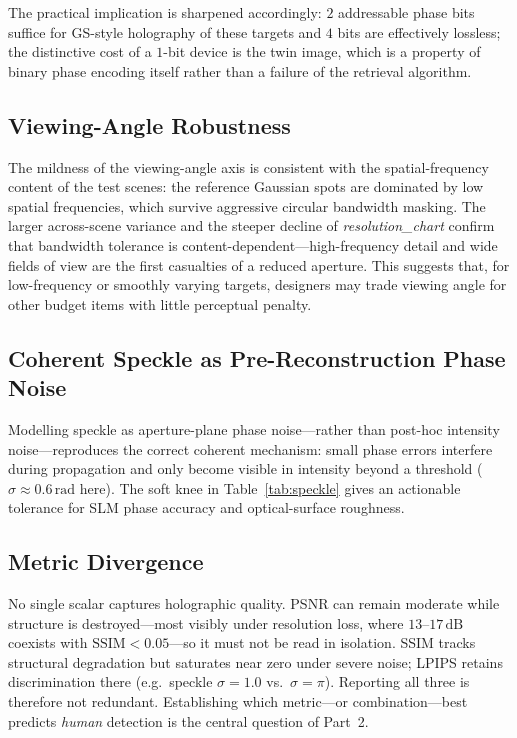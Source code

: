 \documentclass[conference]{IEEEtran}
\begin{document}
The practical implication is sharpened accordingly: $2$ addressable phase bits
suffice for GS-style holography of these targets and $4$ bits are effectively
lossless; the distinctive cost of a $1$-bit device is the twin image, which is a
property of binary phase encoding itself rather than a failure of the retrieval
algorithm.

\subsection{Viewing-Angle Robustness}
The mildness of the viewing-angle axis is consistent with the spatial-frequency
content of the test scenes: the reference Gaussian spots are dominated by
low spatial frequencies, which survive aggressive circular bandwidth masking. The
larger across-scene variance and the steeper decline of \textit{resolution\_chart}
confirm that bandwidth tolerance is content-dependent---high-frequency detail and
wide fields of view are the first casualties of a reduced aperture. This suggests
that, for low-frequency or smoothly varying targets, designers may trade viewing
angle for other budget items with little perceptual penalty.

\subsection{Coherent Speckle as Pre-Reconstruction Phase Noise}
Modelling speckle as aperture-plane phase noise---rather than post-hoc
intensity noise---reproduces the correct coherent mechanism: small phase errors
interfere during propagation and only become visible in intensity beyond a
threshold ($\sigma \approx 0.6\,\text{rad}$ here). The soft knee in
Table~\ref{tab:speckle} gives an actionable tolerance for SLM phase accuracy and
optical-surface roughness.

\subsection{Metric Divergence}
No single scalar captures holographic quality. PSNR can remain moderate while
structure is destroyed---most visibly under resolution loss, where
$13$--$17\,\text{dB}$ coexists with $\text{SSIM} < 0.05$---so it must not be read
in isolation. SSIM tracks structural degradation but saturates near zero under
severe noise; LPIPS retains discrimination there (e.g.\ speckle $\sigma=1.0$
vs.\ $\sigma=\pi$). Reporting all three is therefore not redundant. Establishing which metric---or combination---best
predicts \emph{human} detection is the central question of Part~2.
\end{document}
